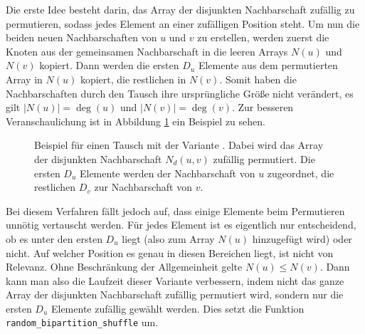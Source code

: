 Die erste Idee besteht darin,  
das Array der disjunkten Nachbarschaft zufällig zu permutieren, sodass jedes Element an 
einer zufälligen Position steht. Um nun die beiden \glqq neuen\grqq{} Nachbarschaften von $u$ und $v$ zu erstellen,
werden zuerst die Knoten aus der gemeinsamen Nachbarschaft in die leeren Arrays $N(u)$ und $N(v)$ kopiert.
Dann werden die ersten $D_{u}$ Elemente aus dem permutierten Array in $N(u)$ kopiert, die restlichen
in $N(v)$. Somit haben die Nachbarschaften durch den Tausch ihre ursprüngliche Größe nicht verändert, es gilt $|N(u)| = \deg(u)$ und
$|N(v)| = \deg(v)$.
Zur besseren Veranschaulichung ist in Abbildung \ref{fig:trade_shuffle} ein Beispiel zu sehen.
\begin{figure}
\centering
  \caption{Beispiel für einen Tausch mit der Variante \perm. Dabei wird das Array der 
  disjunkten Nachbarschaft $N_{d}(u,v)$ zufällig permutiert. Die ersten $D_{u}$ Elemente werden der Nachbarschaft
  von $u$ zugeordnet, die restlichen $D_{v}$ zur Nachbarschaft von $v$. }
  \label{fig:trade_shuffle}
\end{figure}
Bei diesem Verfahren fällt  jedoch auf, dass einige Elemente beim Permutieren unnötig vertauscht werden.
Für jedes Element ist es eigentlich nur entscheidend, ob es unter den ersten $D_{u}$  liegt (also zum Array
$N(u)$ hinzugefügt wird) oder nicht. Auf welcher Position es genau in 
diesen Bereichen liegt, ist nicht von Relevanz. Ohne Beschränkung der Allgemeinheit gelte 
$N(u) \le N(v)$. Dann kann man
also die Laufzeit dieser Variante verbessern, indem nicht das ganze Array der disjunkten Nachbarschaft zufällig permutiert 
wird, sondern nur die ersten $D_{u}$ Elemente zufällig gewählt werden.
 Dies setzt die Funktion 
\texttt{random\_bipartition\_shuffle} um.
\\

